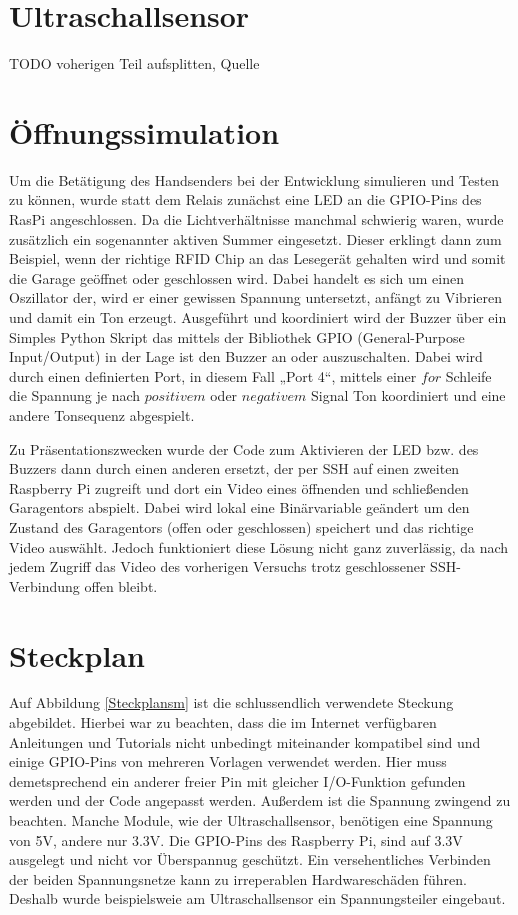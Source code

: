 \section{Ultraschallsensor}
TODO voherigen Teil aufsplitten, Quelle

\section{Öffnungssimulation}
Um die Betätigung des Handsenders bei der Entwicklung simulieren und Testen zu können, wurde statt dem Relais zunächst eine LED an die GPIO-Pins des RasPi angeschlossen. Da die Lichtverhältnisse manchmal schwierig waren, wurde zusätzlich ein sogenannter aktiven Summer eingesetzt. Dieser erklingt dann zum Beispiel, wenn der richtige RFID Chip an das Lesegerät gehalten wird und somit die Garage geöffnet oder geschlossen wird. Dabei handelt es sich um einen Oszillator der, wird er einer gewissen Spannung untersetzt, anfängt zu Vibrieren und damit ein Ton erzeugt. Ausgeführt und koordiniert wird der Buzzer über ein Simples Python Skript das mittels der Bibliothek GPIO (General-Purpose Input/Output) in der Lage ist den Buzzer an oder auszuschalten. Dabei wird durch einen definierten Port, in diesem Fall „Port 4“, mittels einer $for$ Schleife die Spannung je nach $positivem$ oder $negativem$ Signal Ton koordiniert und eine andere Tonsequenz abgespielt.

Zu Präsentationszwecken wurde der Code zum Aktivieren der LED bzw. des Buzzers dann durch einen anderen ersetzt, der per SSH auf einen zweiten Raspberry Pi zugreift und dort ein Video eines öffnenden und schließenden Garagentors abspielt.
Dabei wird lokal eine Binärvariable geändert um den Zustand des Garagentors (offen oder geschlossen) speichert und das richtige Video auswählt.
Jedoch funktioniert diese Lösung nicht ganz zuverlässig, da nach jedem Zugriff das Video des vorherigen Versuchs trotz geschlossener SSH-Verbindung offen bleibt. 


\section{Steckplan}

Auf Abbildung \ref{Steckplansm} ist die schlussendlich verwendete Steckung abgebildet. Hierbei war zu beachten, dass die im Internet verfügbaren Anleitungen und Tutorials nicht unbedingt miteinander kompatibel sind und einige \ac{GPIO}-Pins von mehreren Vorlagen verwendet werden. Hier muss demetsprechend ein anderer freier Pin mit gleicher I/O-Funktion gefunden werden und der Code angepasst werden. Außerdem ist die Spannung zwingend zu beachten. Manche Module, wie der Ultraschallsensor, benötigen eine Spannung von 5V, andere nur 3.3V. Die GPIO-Pins des Raspberry Pi, sind auf 3.3V ausgelegt und nicht vor Überspannug geschützt. Ein versehentliches Verbinden der beiden Spannungsnetze kann zu irreperablen Hardwareschäden führen. Deshalb wurde beispielsweie am Ultraschallsensor ein Spannungsteiler eingebaut.

